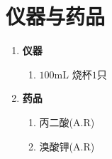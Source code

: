 \documentclass[a4paper]{article}
\begin{document}
\section{仪器与药品}
\begin{enumerate}
    \item \textbf{仪器}\\
    \begin{enumerate}
        \item $100$mL 烧杯$1$只
    \end{enumerate}
    \item \textbf{药品}\\
    \begin{enumerate}
        \item 丙二酸(A.R)
        \item 溴酸钾(A.R)
    \end{enumerate}
\end{enumerate}
\end{document}
